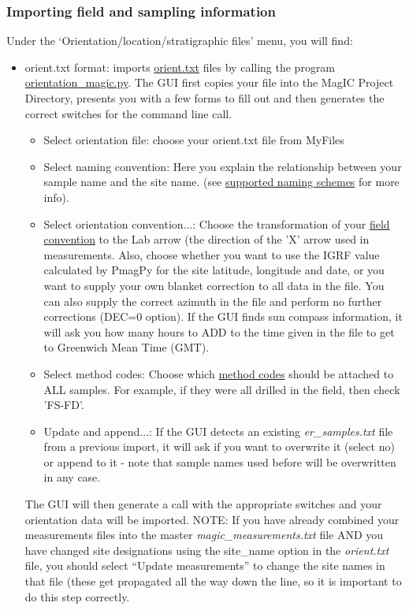 \documentclass[11pt]{book}
\begin{document}
{ \subsubsection{Importing field and sampling information}
 Under the `Orientation/location/stratigraphic files' menu, you will find:
 \begin{itemize}
 \item orient.txt format: imports \href{#field\_info}{orient.txt} files by calling the program \href{#orientation_magic.py}{orientation\_magic.py}. The GUI first copies your file into the MagIC Project Directory, presents you with a few forms to fill out and then generates the correct switches for the command line call. 
 	\begin{itemize}
	\item 	Select orientation file:  choose your orient.txt file from MyFiles
	\item Select naming convention:  Here you explain the relationship between your sample name and the site name. (see \href{#naming_schemes}{supported naming schemes} for more info).
	\item Select orientation convention...:  Choose the transformation of your \href{#orientation_schemes}{field convention} to the Lab arrow (the direction of the 'X' arrow used in measurements.  Also, choose whether you want to use the IGRF value calculated by PmagPy for the site latitude, longitude and date,  or you want to supply your own blanket correction to all data in the file.  You can also supply the correct azimuth in the file and perform no further corrections (DEC=0 option).  If the GUI finds sun compass information, it will ask you how many hours to ADD to the time given in the file to get to Greenwich Mean Time (GMT).  
	\item  Select method codes: Choose which \href{#method_codes}{method codes} should be attached to ALL samples.  For example, if they were all drilled in the field, then check 'FS-FD'.   
	\item Update and append...:  If the GUI detects an existing {\it er\_samples.txt} file from a previous import, it will ask if you want to overwrite it (select no) or append to it - note that sample names used before will be overwritten in any case.
	\end{itemize}
	The GUI will then generate a call with the appropriate switches and your orientation data will be imported.  NOTE: If you have already combined your measurements files into the master {\it magic\_measurements.txt} file AND you have changed site designations using the site\_name option in the {\it orient.txt} file, you should select ``Update measurements'' to change the site names in that file (these get propagated all the way down the line, so it is important to do this step correctly. 

\end{itemize}}
\end{document}
